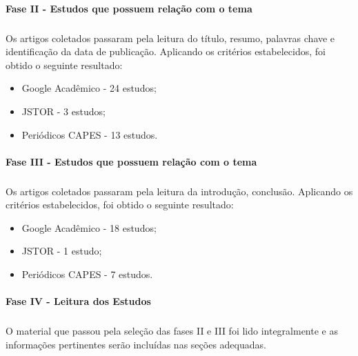 \paragraph{Fase II - Estudos que possuem relação com o tema}
\subparagraph{}
\quad Os artigos coletados passaram pela leitura do título, resumo, palavras chave e identificação da data de publicação.
Aplicando os critérios estabelecidos, foi obtido o seguinte resultado:
\begin{itemize}
  \item Google Acadêmico - 24 estudos;
  \item JSTOR - 3 estudos;
  \item Periódicos CAPES - 13 estudos.
\end{itemize}
\paragraph{Fase III - Estudos que possuem relação com o tema}
\subparagraph{}
\quad Os artigos coletados passaram pela leitura da introdução, conclusão.
Aplicando os critérios estabelecidos, foi obtido o seguinte resultado:
\begin{itemize}
  \item Google Acadêmico - 18 estudos;
  \item JSTOR - 1 estudo;
  \item Periódicos CAPES - 7 estudos.
\end{itemize}
\paragraph{Fase IV - Leitura dos Estudos}
\subparagraph{}
\quad O material que passou pela seleção das fases II e III foi lido integralmente e as
informações pertinentes serão incluídas nas seções adequadas.
